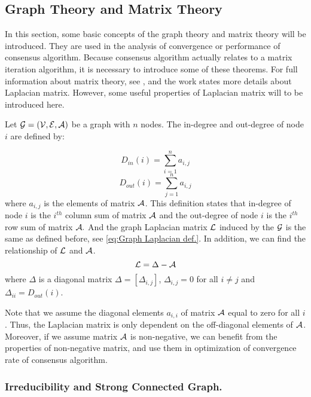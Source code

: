 
\subsection{Graph Theory and Matrix Theory}

In this section, some basic concepts of the graph theory and matrix
theory will be introduced. They are used in the analysis of convergence
or performance of consensus algorithm. Because consensus algorithm
actually relates to a matrix iteration algorithm, it is necessary
to introduce some of these theorems. For full information about matrix
theory, see \cite{Varga2010}, and the work \cite{Russell1994} states
more details about Laplacian matrix. However, some useful properties
of Laplacian matrix will to be introduced here. 

Let ${\cal G}=\left({\cal V},{\cal E},{\cal A}\right)$ be a graph
with $n$ nodes. The in-degree and out-degree of node $i$ are defined
by:

\begin{equation}
D_{in}\left(i\right)=\sum_{i=1}^{n}a_{i,j}
\end{equation}
\begin{equation}
D_{out}\left(i\right)=\sum_{j=1}^{n}a_{i,j}
\end{equation}
where $a_{i,j}$ is the elements of matrix ${\cal A}$. This definition
states that in-degree of node $i$ is the $i^{th}$ column sum of
matrix ${\cal A}$ and the out-degree of node $i$ is the $i^{th}$
row sum of matrix ${\cal A}.$ And the graph Laplacian matrix ${\cal L}$
induced by the ${\cal G}$ is the same as defined before, see \ref{eq:Graph Laplacian def.}.
In addition, we can find the relationship of ${\cal L}$ and ${\cal A}$.
\begin{equation}
{\cal L}=\Delta-{\cal A}
\end{equation}
 where $\Delta$ is a diagonal matrix $\Delta=\left[\Delta_{i,j}\right]$,
$\Delta_{i,j}=0$ for all $i\neq j$ and $\Delta_{ii}=D_{out}\left(i\right)$.

Note that we assume the diagonal elements $a_{i,i}$ of matrix ${\cal A}$
equal to zero for all $i$. Thus, the Laplacian matrix is only dependent
on the off-diagonal elements of ${\cal A}$. Moreover, if we assume
matrix ${\cal A}$ is non-negative, we can benefit from the properties
of non-negative matrix, and use them in optimization of convergence
rate of consensus algorithm.


\subsubsection{Irreducibility and Strong Connected Graph.}

